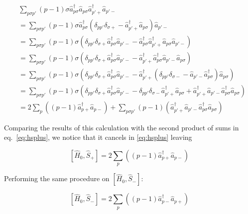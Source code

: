 \documentclass[11pt]{article}
\newcommand{\sop}[1]{%
	\ensuremath{ \hat{S}_{#1} } }
\newcommand{\cop}[2]{%
	\ensuremath{ \hat{a} _{#1 #2} ^{\dagger} }}
\newcommand{\aop}[2]{%
	\ensuremath{ \hat{a} _{#1 #2} }}
\newcommand{\krondelt}[2]{%
	\ensuremath{ \delta _{#1 #2} }}
\newcommand{\hop}{
	\ensuremath{ \hat{H} _0 }}
\newcommand{\commutator}[2]{%
	\ensuremath{ \left [ #1,#2 \right ] }}
\begin{document}
\begin{align}
	& \sum_{p \sigma p'} (p-1) \sigma \cop{p}{\sigma} \aop{p}{\sigma} \cop{p'}{+} \aop{p'}{-}\\
	&= \sum_{p \sigma p'} (p-1) \sigma \cop{p}{\sigma} \left (\krondelt{p}{p'} \krondelt{\sigma}{+} -  \cop{p'}{+} \aop{p}{\sigma} \right ) \aop{p'}{-}\\
	&= \sum_{p \sigma p'} (p-1) \sigma \left ( \krondelt{p}{p'} \krondelt{\sigma}{+} \cop{p}{\sigma} \aop{p'}{-} - \cop{p}{\sigma}  \cop{p'}{+} \aop{p}{\sigma} \aop{p'}{-} \right )\\
	&= \sum_{p \sigma p'} (p-1) \sigma \left ( \krondelt{p}{p'} \krondelt{\sigma}{+} \cop{p}{\sigma} \aop{p'}{-} - \cop{p'}{+} \cop{p}{\sigma} \aop{p'}{-} \aop{p}{\sigma} \right )\\
	&= \sum_{p \sigma p'} (p-1) \sigma \left ( \krondelt{p}{p'} \krondelt{\sigma}{+} \cop{p}{\sigma} \aop{p'}{-} - \cop{p'}{+} \left ( \krondelt{p}{p'} \krondelt{\sigma}{-} - \aop{p'}{-} \cop{p}{\sigma} \right ) \aop{p}{\sigma} \right )\\
	&= \sum_{p \sigma p'} (p-1) \sigma \left ( \krondelt{p}{p'} \krondelt{\sigma}{+} \cop{p}{\sigma} \aop{p'}{-} - \krondelt{p}{p'} \krondelt{\sigma}{-} \cop{p'}{+} \aop{p}{\sigma} + \cop{p'}{+} \aop{p'}{-} \cop{p}{\sigma} \aop{p}{\sigma} \right )\\
	&= 2 \sum_{p}  \left ( (p-1) \cop{p}{+} \aop{p}{-} \right ) + \sum_{p \sigma p'} (p-1) \left ( \cop{p'}{+} \aop{p'}{-} \cop{p}{\sigma} \aop{p}{\sigma} \right )
\end{align}

Comparing the results of this calculation with the second product of sums in eq.~\ref{eq:hsplus}, we notice that it cancels in \ref{eq:hsplus} leaving

\begin{equation}
	\commutator{\hop}{\sop{+}} = 2 \sum_{p}  \left ( (p-1) \cop{p}{+} \aop{p}{-} \right )
	\label{eq:hsplusres}
\end{equation}

Performing the same procedure on \commutator{\hop}{\sop{-}}:

\begin{equation}
	\commutator{\hop}{\sop{-}} = 2 \sum_{p}  \left ( (p-1) \cop{p}{-} \aop{p}{+} \right )
	\label{eq:hsminusres}
\end{equation}
\end{document}

